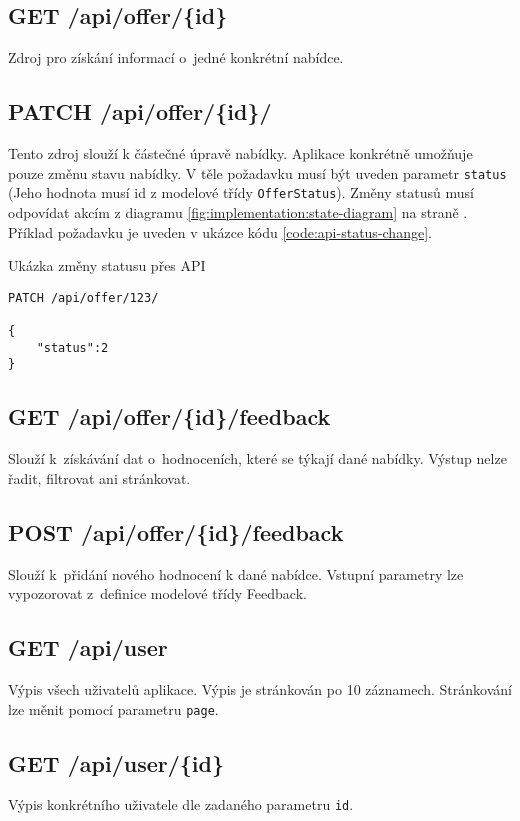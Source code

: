 \subsection{GET /api/offer/\{id\}}
Zdroj pro získání informací o~jedné konkrétní nabídce.

\subsection{PATCH /api/offer/\{id\}/}
Tento zdroj slouží k částečné úpravě nabídky. Aplikace konkrétně umožňuje pouze změnu stavu nabídky. V těle požadavku musí být uveden parametr \texttt{status} (Jeho hodnota musí id z modelové třídy \texttt{OfferStatus}). Změny statusů musí odpovídat akcím z diagramu \ref{fig:implementation:state-diagram} na straně \pageref{fig:implementation:state-diagram}. Příklad požadavku je uveden v ukázce kódu \ref{code:api-status-change}.

\begin{listing}[htbp]
\caption{\label{code:api-status-change}Ukázka změny statusu přes API}
\begin{verbatim}
PATCH /api/offer/123/

{
    "status":2
}
\end{verbatim}
\end{listing}


\subsection{GET /api/offer/\{id\}/feedback}
Slouží k~získávání dat o~hodnoceních, které se týkají dané nabídky. Výstup nelze řadit, filtrovat ani stránkovat.

\subsection{POST /api/offer/\{id\}/feedback}
Slouží k~přidání nového hodnocení k dané nabídce. Vstupní parametry lze vypozorovat z~definice modelové třídy Feedback.

\subsection{GET /api/user}
Výpis všech uživatelů aplikace. Výpis je stránkován po 10 záznamech. Stránkování lze měnit pomocí parametru \texttt{page}.

\subsection{GET /api/user/\{id\}}
Výpis konkrétního uživatele dle zadaného parametru \texttt{id}.

